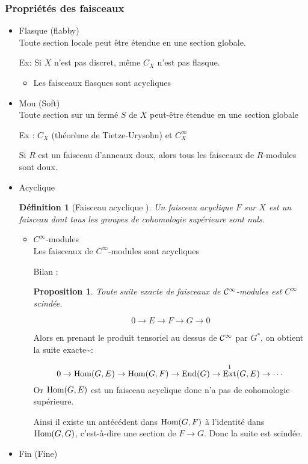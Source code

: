 \documentclass[12pt,makeidx]{amsart}
\newtheorem{prop}{Proposition}
\newtheorem{defi}{Définition}
\DeclareMathOperator{\Ext}{Ext}
\begin{document}
\subsubsection{Propriétés des faisceaux}
\label{sec-1-6-3}
\begin{itemize}

\item Flasque (flabby)\\
\label{sec-1-6-3-1}%
Toute section locale peut être étendue en une section globale.

Ex: Si $X$ n'est pas discret, même $C_X$ n'est pas flasque.
\begin{itemize}

\item Les faisceaux flasques sont acycliques
\label{sec-1-6-3-1-1}%
\end{itemize} %

\item Mou (Soft)\\
\label{sec-1-6-3-2}%
Toute section sur un fermé $S$ de $X$ peut-être étendue en une section globale

Ex : $C_X$ (théorème de Tietze-Urysohn) et $C_X^\infty$

Si $R$ est un faisceau d'anneaux doux, alors tous les faisceaux de $R$-modules sont doux.

\item Acyclique
\label{sec-1-6-3-3}%
\begin{defi}[Faisceau acyclique \label{acyclique}]
Un faisceau acyclique $F$ sur  $X$ est un faisceau dont tous les groupes de cohomologie supérieure sont nuls.
\end{defi}
\begin{itemize}

\item $C^\infty$-modules\\
\label{sec-1-6-3-3-1}%
Les faisceaux de $C^\infty$-modules sont acycliques

Bilan : 
\begin{prop}
Toute suite exacte de faisceaux de $\mathcal{C}^\infty$-modules est $C^\infty$ scindée.
\end{prop}

\[
0 \rightarrow E \rightarrow F \rightarrow G \rightarrow 0
\]

Alors en prenant le produit tensoriel au dessus de $\mathcal{C}^\infty$ par $G^*$, on obtient la suite exacte\~{}:

\[
0 \rightarrow \Hom(G,E) \rightarrow \Hom(G,F) \rightarrow \End(G) \rightarrow \Ext^1(G,E) \rightarrow \cdots
\]
Or $\text{Hom}(G,E)$ est un faisceau acyclique donc n'a pas de cohomologie supérieure.

Ainsi il existe un antécédent dans $\text{Hom}(G,F)$ à l'identité dans $\text{Hom}(G,G)$, c'est-à-dire une section de $F \rightarrow G$. Donc la suite est scindée.
\end{itemize} %

\item Fin (Fine)
\label{sec-1-6-3-4}%
\end{itemize} %
\end{document}
